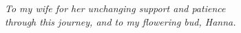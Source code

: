 \documentclass{altmsuphddissertation}
\begin{document}



\begin{dedication}
\centering
{\it
To my wife for her unchanging support and patience\\ through this journey,
and to my flowering bud, Hanna. 
}
\end{dedication}
\end{document}
